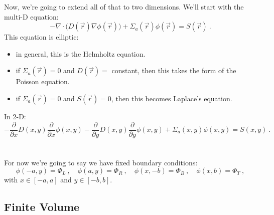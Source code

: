 \documentclass[12pt, answers]{exam}
\begin{document}
Now, we're going to extend all of that to two dimensions. We'll start with the multi-D equation:
\[-\nabla \cdot \bigl(D(\vec{r})\nabla \phi(\vec{r})\bigr) + \Sigma_a(\vec{r}) \phi(\vec{r}) = S(\vec{r})\:.\]
%
This equation is elliptic:
\begin{itemize}
\item in general, this is the Helmholtz equation.
\item if $\Sigma_a(\vec{r})=0$ and $D(\vec{r})=$ constant, then this takes the form of the Poisson equation.
\item if $\Sigma_a(\vec{r})=0$ and $S(\vec{r})=0$, then this becomes Laplace's equation. 
\end{itemize}

In 2-D:
\ifprintanswers
\[-\frac{\partial}{\partial x}D(x,y)\frac{\partial}{\partial x} \phi(x,y) -\frac{\partial}{\partial y}D(x,y)\frac{\partial}{\partial y} \phi(x,y) + \Sigma_a(x,y) \phi(x,y) = S(x,y)\:.\]
\else
\\ \vspace*{2em} \\
\fi
%
For now we're going to say we have fixed boundary conditions:
\[\phi(-a,y) = \Phi_L\:, \quad \phi(a,y) = \Phi_R\:, \quad \phi(x,-b) = \Phi_B\:, \quad \phi(x,b) = \Phi_T\:,\]
with $x \in [-a,a]$ and $y \in [-b,b]$.


\subsection*{Finite Volume}
%
\end{document}
